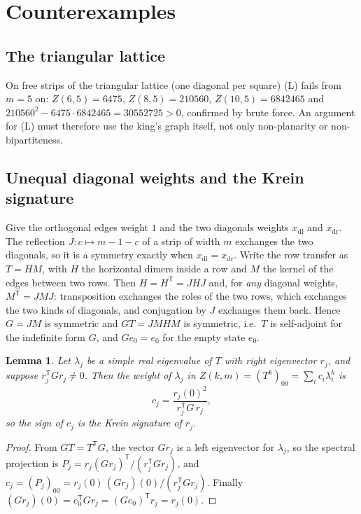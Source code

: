 \documentclass[11pt]{amsart}
\newtheorem{lemma}[theorem]{Lemma}
\theoremstyle{definition}
\theoremstyle{remark}
\begin{document}
\section{Counterexamples}\label{sec:counter}

\subsection{The triangular lattice}
On free strips of the triangular lattice (one diagonal per square) (L) fails from $m = 5$ on:
$Z(6, 5) = 6475$, $Z(8, 5) = 210560$, $Z(10, 5) = 6842465$ and
$210560^2 - 6475\cdot6842465 = 30552725 > 0$, confirmed by brute force. An argument for (L) must
therefore use the king's graph itself, not only non-planarity or non-bipartiteness.

\subsection{Unequal diagonal weights and the Krein signature}\label{sec:krein}
Give the orthogonal edges weight $1$ and the two diagonals weights $x_{\mathrm{dl}}$ and
$x_{\mathrm{dr}}$. The reflection $J\colon c \mapsto m - 1 - c$ of a strip of width $m$ exchanges the
two diagonals, so it is a symmetry exactly when $x_{\mathrm{dl}} = x_{\mathrm{dr}}$. Write the row
transfer as $T = HM$, with $H$ the horizontal dimers inside a row and $M$ the kernel of the edges
between two rows. Then $H = H^{\mathsf T} = JHJ$ and, for \emph{any} diagonal weights,
$M^{\mathsf T} = JMJ$: transposition exchanges the roles of the two rows, which exchanges the two
kinds of diagonals, and conjugation by $J$ exchanges them back. Hence $G = JM$ is symmetric and $GT = JMHM$ is symmetric, i.e.\ $T$
is self-adjoint for the indefinite form $G$, and $G e_0 = e_0$ for the empty state $e_0$.

\begin{lemma}\label{lem:krein}
Let $\lambda_j$ be a simple real eigenvalue of $T$ with right eigenvector $r_j$, and suppose
$r_j^{\mathsf T} G r_j \ne 0$. Then the weight of $\lambda_j$ in
$Z(k, m) = (T^k)_{00} = \sum_i c_i \lambda_i^k$ is
\[
  c_j = \frac{r_j(0)^2}{r_j^{\mathsf T} G\, r_j},
\]
so the sign of $c_j$ is the Krein signature of $r_j$.
\end{lemma}
\begin{proof}
From $GT = T^{\mathsf T} G$, the vector $G r_j$ is a left eigenvector for $\lambda_j$, so the spectral
projection is $P_j = r_j (G r_j)^{\mathsf T} / (r_j^{\mathsf T} G r_j)$, and
$c_j = (P_j)_{00} = r_j(0)\,(G r_j)(0) / (r_j^{\mathsf T} G r_j)$. Finally
$(G r_j)(0) = e_0^{\mathsf T} G r_j = (G e_0)^{\mathsf T} r_j = r_j(0)$.
\end{proof}
\end{document}
